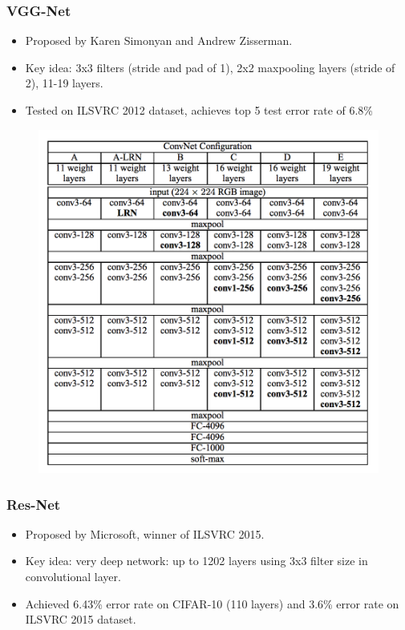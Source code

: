 \documentclass{beamer}
\begin{document}
\begin{frame}\frametitle{VGG-Net}
\begin{itemize}
	\item Proposed by Karen Simonyan and Andrew Zisserman.
	\item Key idea: 3x3 filters (stride and pad of 1), 2x2 maxpooling layers (stride of 2), 11-19 layers.
	\item Tested on ILSVRC 2012 dataset, achieves top 5 test error rate of 6.8\%
\end{itemize}
\begin{figure}[h]
	\includegraphics[scale=0.25]{figures/vggnet}
	\centering
	\label{fig:vgg}
\end{figure}
\end{frame}
\begin{frame}\frametitle{Res-Net}
\begin{itemize}
	\item Proposed by Microsoft, winner of ILSVRC 2015.
	\item Key idea: very deep network: up to 1202 layers using 3x3 filter size in convolutional layer.
	\item Achieved 6.43\% error rate on CIFAR-10 (110 layers) and 3.6\% error rate on ILSVRC 2015 dataset. 
\end{itemize}
\end{frame}
\end{document}
